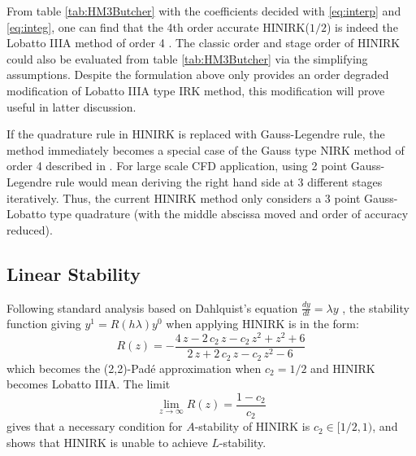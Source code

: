 \documentclass[preprint,12pt]{elsarticle}
\begin{document}
From table \ref{tab:HM3Butcher} with the coefficients
decided with \eqref{eq:interp} and \eqref{eq:integ},
one can find that the 4th order accurate
HINIRK($1/2$) is indeed the Lobatto IIIA method
of order 4 \cite{wanner1996solving}.
The classic order and stage order of HINIRK could
also be evaluated from table \ref{tab:HM3Butcher} via
the simplifying assumptions.
Despite the formulation above only
provides an order degraded modification 
of Lobatto IIIA type IRK method, 
this modification will prove useful 
in latter discussion.

If the quadrature rule in HINIRK is 
replaced with Gauss-Legendre rule, 
the method immediately becomes a special case of the 
Gauss type NIRK method of order 4 
described in \cite{kulikov2006familyNIRKOrig}. 
For large scale CFD application, 
using 2 point Gauss-Legendre rule 
would mean deriving the right hand side at 
3 different stages iteratively. 
Thus, the current HINIRK method only considers 
a 3 point Gauss-Lobatto type quadrature 
(with the middle abscissa moved and order of accuracy reduced).   




\subsection{Linear Stability}

Following standard analysis based on Dahlquist's equation
 $\frac{dy}{dt} = \lambda y$ \cite{wanner1996solving}, 
the stability function giving $y^{1}=R(h\lambda)y^0$ 
when applying HINIRK is in the form:
\begin{equation}
    R(z) = -\frac{4\,z-2\,c_{2}\,z-c_{2}\,z^2+z^2+6}{2\,z+2\,c_{2}\,z-c_{2}\,z^2-6}
\end{equation}
which becomes the (2,2)-Pad{\'e} approximation when $c_2=1/2$ and HINIRK
becomes Lobatto IIIA. The limit 
\begin{equation}
    \lim_{z\rightarrow\infty}R(z) = \frac{1-c_2}{c_2}
\end{equation}
gives that a necessary condition for $A$-stability of 
HINIRK is $c_2 \in [1/2,1)$, and shows that HINIRK 
is unable to achieve $L$-stability.
\end{document}
